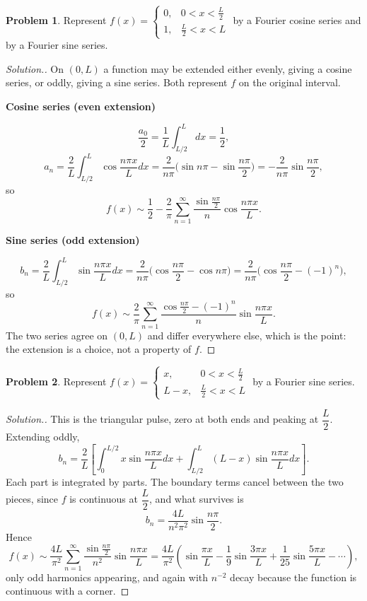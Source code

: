 \documentclass[11pt,a4paper]{article}
\theoremstyle{definition}
\newtheorem{problemx}{Problem}[subsection]
\newenvironment{problem}{\begin{problemx}}{\end{problemx}}
\newenvironment{solution}
  {\renewcommand{\qedsymbol}{}\begin{proof}[\textit{Solution}.]}
  {\end{proof}}
\newcommand{\subhead}[1]{%
  \par\medskip\noindent\textbf{#1}\par\nobreak\smallskip}
\begin{document}
\begin{problem}
Represent $f(x) = \begin{cases}0, & 0<x<\frac L2\\ 1, & \frac L2<x<L\end{cases}$
by a Fourier cosine series and by a Fourier sine series.
\end{problem}
\begin{solution}
On $(0,L)$ a function may be extended either evenly, giving a cosine series, or
oddly, giving a sine series. Both represent $f$ on the original interval.

\subhead{Cosine series (even extension)}
$$\frac{a_0}{2} = \frac1L\int_{L/2}^{L}dx = \frac12 ,$$
$$a_n = \frac2L\int_{L/2}^{L}\cos\frac{n\pi x}{L}dx
= \frac{2}{n\pi}\Big(\sin n\pi - \sin\frac{n\pi}{2}\Big)
= -\frac{2}{n\pi}\sin\frac{n\pi}{2},$$
so
$$f(x)\sim\frac12 - \frac{2}{\pi}\sum_{n=1}^{\infty}
\frac{\sin\frac{n\pi}{2}}{n}\cos\frac{n\pi x}{L}.$$

\subhead{Sine series (odd extension)}
$$b_n = \frac2L\int_{L/2}^{L}\sin\frac{n\pi x}{L}dx
= \frac{2}{n\pi}\Big(\cos\frac{n\pi}{2} - \cos n\pi\Big)
= \frac{2}{n\pi}\Big(\cos\frac{n\pi}{2} - (-1)^n\Big),$$
so
$$f(x)\sim\frac{2}{\pi}\sum_{n=1}^{\infty}
\frac{\cos\frac{n\pi}{2}-(-1)^n}{n}\sin\frac{n\pi x}{L}.$$
The two series agree on $(0,L)$ and differ everywhere else, which is the point:
the extension is a choice, not a property of $f$.
\end{solution}

\begin{problem}
Represent $f(x) = \begin{cases}x, & 0<x<\frac L2\\ L-x, & \frac L2<x<L\end{cases}$
by a Fourier sine series.
\end{problem}
\begin{solution}
This is the triangular pulse, zero at both ends and peaking at
$\dfrac L2$. Extending oddly,
$$b_n = \frac2L\left[\int_0^{L/2}x\sin\frac{n\pi x}{L}dx
+ \int_{L/2}^{L}(L-x)\sin\frac{n\pi x}{L}dx\right].$$
Each part is integrated by parts. The boundary terms cancel between the two
pieces, since $f$ is continuous at $\dfrac L2$, and what survives is
$$b_n = \frac{4L}{n^2\pi^2}\sin\frac{n\pi}{2}.$$
Hence
$$f(x)\sim\frac{4L}{\pi^2}\sum_{n=1}^{\infty}
\frac{\sin\frac{n\pi}{2}}{n^2}\sin\frac{n\pi x}{L}
= \frac{4L}{\pi^2}\left(\sin\frac{\pi x}{L}
- \frac19\sin\frac{3\pi x}{L} + \frac{1}{25}\sin\frac{5\pi x}{L}-\cdots\right),$$
only odd harmonics appearing, and again with $n^{-2}$ decay because the function
is continuous with a corner.
\end{solution}
\end{document}
